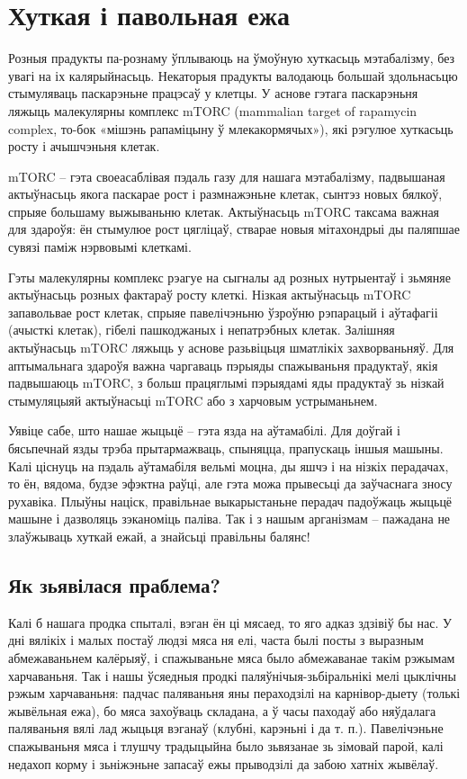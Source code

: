 \chapter{Хуткая і павольная ежа}

Розныя прадукты па-рознаму ўплываюць на ўмоўную хуткасьць мэтабалізму, без увагі на іх калярыйнасьць. Некаторыя прадукты валодаюць большай здольнасьцю стымуляваць паскарэньне працэсаў у клетцы. У аснове гэтага паскарэньня ляжыць малекулярны комплекс mTORC (mammalian target of rapamycin complex, то-бок «мішэнь рапаміцыну ў млекакормячых»), які рэгулюе хуткасьць росту і ачышчэньня клетак.

mTORC – гэта своеасаблівая пэдаль газу для нашага мэтабалізму, падвышаная актыўнасьць якога паскарае рост і размнажэньне клетак, сынтэз новых бялкоў, спрыяе большаму выжываньню клетак. Актыўнасьць mTORС таксама важная для здароўя: ён стымулюе рост цягліцаў, стварае новыя мітахондрыі ды паляпшае сувязі паміж нэрвовымі клеткамі.

Гэты малекулярны комплекс рэагуе на сыгналы ад розных нутрыентаў і зьмяняе актыўнасьць розных фактараў росту клеткі. Нізкая актыўнасьць mTORC запавольвае рост клетак, спрыяе павелічэньню ўзроўню рэпарацый і аўтафагіі (ачысткі клетак), гібелі пашкоджаных і непатрэбных клетак. Залішняя актыўнасьць mTORC ляжыць у аснове разьвіцьця шматлікіх захворваньняў. Для аптымальнага здароўя важна чаргаваць пэрыяды спажываньня прадуктаў, якія падвышаюць mTORC, з больш працяглымі пэрыядамі яды прадуктаў зь нізкай стымуляцыяй актыўнасьці mTORC або з харчовым устрыманьнем.

Уявіце сабе, што нашае жыцьцё – гэта язда на аўтамабілі. Для доўгай і бясьпечнай язды трэба прытармажваць, спыняцца, прапускаць іншыя машыны. Калі ціснуць на пэдаль аўтамабіля вельмі моцна, ды яшчэ і на нізкіх перадачах, то ён, вядома, будзе эфэктна раўці, але гэта можа прывесьці да заўчаснага зносу рухавіка. Плыўны націск, правільнае выкарыстаньне перадач падоўжаць жыцьцё машыне і дазволяць зэканоміць паліва. Так і з нашым арганізмам – пажадана не злаўжываць хуткай ежай, а знайсьці правільны балянс!

\section{Як зьявілася праблема?}

Калі б нашага продка спыталі, вэган ён ці мясаед, то яго адказ здзівіў бы нас. У дні вялікіх і малых постаў людзі мяса ня елі, часта былі посты з выразным абмежаваньнем калёрыяў, і спажываньне мяса было абмежаванае такім рэжымам харчаваньня. Так і нашы ўсяедныя продкі паляўнічыя-зьбіральнікі мелі цыклічны рэжым харчаваньня: падчас паляваньня яны пераходзілі на карнівор-дыету (толькі жывёльная ежа), бо мяса захоўваць складана, а ў часы паходаў або няўдалага паляваньня вялі лад жыцьця вэганаў (клубні, карэньні і да т. п.). Павелічэньне спажываньня мяса і тлушчу традыцыйна было зьвязанае зь зімовай парой, калі недахоп корму і зьніжэньне запасаў ежы прыводзілі да забою хатніх жывёлаў.

